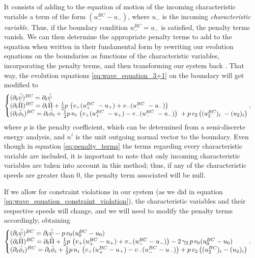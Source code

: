 It consists of adding to the equation of motion of the incoming characteristic variable a term of the form $(u_-^{BC}  - u_-)$, where $u_-$ is the incoming \textit{characteristic variable}. Thus, if the boundary condition $u_-^{BC} = u_-$ is satisfied, the penalty terms vanish. We can then determine the appropriate penalty terms to add to the equation when written in their fundamental form by rewriting our evolution equations on the boundaries as functions of the characteristic variables, incorporating the penalty terms, and then transforming our system back \cite{Pseudospectral_method_for_gravitational_wave_collapse,Spectral_methods_for_the_wave_equation_in_second-order_form}. That way, the evolution equations \eqref{eq:wave_equation_3+1} on the boundary will get modified to
%
\begin{align}
    \left\{\begin{array}{@{}l@{}} 
        (\partial_t\tilde{\psi})^{BC} = \partial_t\tilde{\psi} \\
        (\partial_t\tilde{\Pi})^{BC} = \partial_t\tilde{\Pi} + \frac{1}{2} p \, \left( v_+(u_+^{BC}  - u_+) + v_- (u_-^{BC}  - u_-) \right) \\
        (\partial_t\tilde{\phi}_i)^{BC} = \partial_t\tilde{\phi}_i + \frac{1}{2} p \, n_i \, \left( v_+(u_+^{BC}  - u_+) - v_- (u_-^{BC}  - u_-) \right)  + p \, v_2 \left((u_2^{BC})_i  - (u_2)_i \right) \\
    \end{array}\right. ,
    \label{eq:penalty_terms}
\end{align}
%
where $p$ is the penalty coefficient, which can be determined from a semi-discrete energy analysis, and $n^i$ is the unit outgoing normal vector to the boundary. Even though in equation \eqref{eq:penalty_terms} the terms regarding every characteristic variable are included, it is important to note that only incoming characteristic variables are taken into account in this method; thus, if any of the characteristic speeds are greater than $0$, the penalty term associated will be null. 

If we allow for constraint violations in our system (as we did in equation \eqref{eq:wave_equation_constraint_violation}), the characteristic variables and their respective speeds will change, and we will need to modify the penalty terms accordingly, obtaining
%
\begin{align}
    \left\{\begin{array}{@{}l@{}} 
        (\partial_t\tilde{\psi})^{BC} = \partial_t\tilde{\psi} - p \, v_0 (u_0^{BC}  - u_0)\\
        (\partial_t\tilde{\Pi})^{BC} = \partial_t\tilde{\Pi} + \frac{1}{2} p \, \left( v_+(u_+^{BC}  - u_+) + v_- (u_-^{BC}  - u_-) \right) - 2 \, \gamma_2 \, p \, v_0 (u_0^{BC}  - u_0)\\
        (\partial_t\tilde{\phi}_i)^{BC} = \partial_t\tilde{\phi}_i + \frac{1}{2} p \, n_i \, \left( v_+(u_+^{BC}  - u_+) - v_- (u_-^{BC}  - u_-) \right)  + p \, v_2 \left((u_2^{BC})_i  - (u_2)_i \right) \\
    \end{array}\right. .
\end{align}

